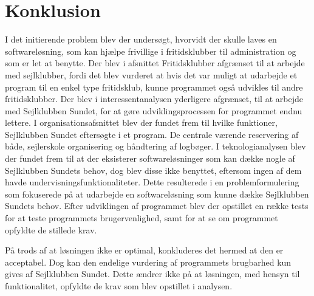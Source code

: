 \chapter{Konklusion}
I det initierende problem blev der undersøgt, hvorvidt der skulle laves en softwareløsning, som kan hjælpe frivillige i fritidsklubber til administration og som er let at benytte. 
Der blev i afsnittet Fritidsklubber afgrænset til at arbejde med sejlklubber, fordi det blev vurderet at hvis det var muligt at udarbejde et program til en enkel type fritidsklub, kunne programmet også udvikles til andre fritidsklubber. 
Der blev i interessentanalysen yderligere afgrænset, til at arbejde med Sejlklubben Sundet, for at gøre udviklingsprocessen for programmet endnu lettere.
I organisationsafsnittet blev der fundet frem til hvilke funktioner, Sejlklubben Sundet eftersøgte i et program.
De centrale værende reservering af både, sejlerskole organisering og håndtering af logbøger.
I teknologianalysen blev der fundet frem til at der eksisterer softwareløsninger som kan dække nogle af Sejlklubben Sundets behov, dog blev disse ikke benyttet, eftersom ingen af dem havde undervisningsfunktionaliteter. 
Dette resulterede i en problemformulering som fokuserede på at udarbejde en softwareløsning som kunne dække Sejlklubben Sundets behov. 
Efter udviklingen af programmet blev der opstillet en række tests for at teste programmets brugervenlighed, samt for at se om programmet opfyldte de stillede krav.

På trods af at løsningen ikke er optimal, konkluderes det hermed at den er acceptabel. 
Dog kan den endelige vurdering af programmets brugbarhed kun gives af Sejlklubben Sundet.
Dette ændrer ikke på at løsningen, med hensyn til funktionalitet, opfyldte de krav som blev opstillet i analysen. 

